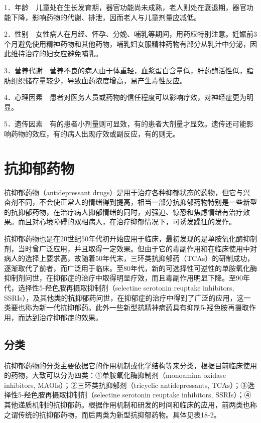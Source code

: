 1．年龄　儿童处在生长发育期，器官功能尚未成熟，老人则处在衰退期，器官功能下降，影响药物的代谢、排泄，因而老人与儿童剂量应减低。

2．性别　女性病人在月经、怀孕、分娩、哺乳等期间，用药应特别注意。妊娠前3个月避免使用精神药物和其他药物，哺乳妇女服精神药物有部分从乳汁中分泌，因此维持治疗的妇女应避免哺乳。

3．营养代谢　营养不良的病人由于体重轻，血浆蛋白含量低，肝药酶活性低，脂肪组织储存量较少，导致血药浓度增高，易产生毒性反应。

4．心理因素　患者对医务人员或药物的信任程度可以影响疗效，对神经症更为明显。

5．遗传因素　有的患者小剂量则可显效，有的患者大剂量才显效。遗传还可能影响药物的效应，有的病人出现疗效或副反应，有的则无。



\section{抗抑郁药物}

抗抑郁药物（antidepressant
drugs）是用于治疗各种抑郁状态的药物，但它与兴奋剂不同，不会使正常人的情绪得到提高，相当一部分抗抑郁药物特别是一些新型的抗抑郁药物，在治疗病人抑郁情绪的同时，对强迫、惊恐和焦虑情绪有治疗效果。而且对心境障碍的双相病人，在治疗抑郁情况下，可诱发躁狂的发作。

抗抑郁药物也是在20世纪50年代初开始应用于临床，最初发现的是单胺氧化酶抑制剂，当时曾广泛应用，并且取得一定效果。但由于它的毒副作用和在临床使用中对病人的选择上要求高，故随着50年代末，三环类抗抑郁药（TCAs）的研制成功，逐渐取代了前者，而广泛用于临床。至80年代，新的可选择性可逆性的单胺氧化酶抑制剂问世，在抑郁症的治疗中取得明显疗效，而且毒副作用明显下降。至90年代，选择性5-羟色胺再摄取抑制剂（selectine
serotonin reuptake inhibitors,
SSRIs），及其他类的抗抑郁药问世，在抑郁症的治疗中得到了广泛的应用，这一类要也称为新一代抗抑郁药。此外一些新型抗精神病药具有抑制5-羟色胺再摄取作用，而达到治疗抑郁症的效果。

\subsection{分类}

抗抑郁药物的分类主要依据它的作用机制或化学结构等来分类，根据目前临床使用的药物，大致可以分为四类：①单胺氧化酶抑制剂（monoamina
oxidase inhibitors, MAOIs）；②三环类抗抑郁剂（tricyclic antidepressants,
TCAs）；③选择性5-羟色胺再摄取抑制剂（selectine serotonin reuptake
inhibitors,
SSRIs）；④其他递质机制的抗抑郁药。根据作用机制和研发的时间和临床的应用，前两类也称之谓传统的抗抑郁药物，而后两类为新型抗抑郁药物。具体见表18-2。


